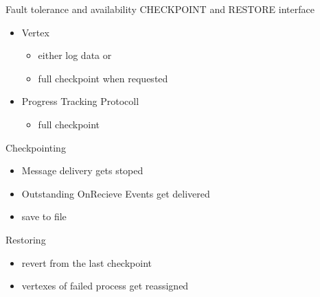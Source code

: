  \begin{frame}[t]{Fault tolerance and availability}
  \vspace{0.15cm}
  CHECKPOINT and RESTORE interface
   \begin{itemize}\setlength\itemsep{0.25cm}
     \item Vertex
	 \begin{itemize}\setlength\itemsep{0.25cm}
	 	\item either log data or
        \item full checkpoint when requested
	 \end{itemize}
     \item Progress Tracking Protocoll
     \begin{itemize}\setlength\itemsep{0.25cm}
     	\item full checkpoint
     \end{itemize}
   \end{itemize}
   
   \pause
    \vspace{0.15cm}
   Checkpointing
   \begin{itemize}
   \item Message delivery gets stoped
   \item Outstanding OnRecieve Events get delivered
   \item save to file
   \end{itemize}
   Restoring
   \begin{itemize}
   \item revert from the last checkpoint
   \item vertexes of failed process get reassigned
   \end{itemize}

\end{frame}




